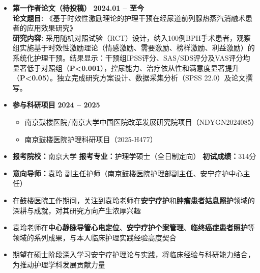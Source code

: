 \documentclass[zh]{resume}
\begin{document}
\begin{itemize}
        \small
        \item
        \textbf{第一作者论文（待投稿）} \hfill \textbf{2024.01 -- 至今}
          \\
        \textbf{论文题目: } 《基于时效性激励理论的护理干预在经尿道前列腺热蒸汽消融术患者的应用效果研究》
        \\
        \textbf{研究内容: } 采用随机对照试验（RCT）设计，纳入100例BPH手术患者，观察组实施基于时效性激励理论（情感激励、需要激励、榜样激励、利益激励）的系统化护理干预。结果显示：干预组IPSS评分、SAS/SDS评分及VAS评分均显著低于对照组（\textbf{P<0.001}），控尿能力、治疗依从性和满意度显著提升（\textbf{P<0.05}）。独立完成研究方案设计、数据采集分析（SPSS 22.0）及论文撰写。

        \item
        \textbf{参与科研项目} \hfill \textbf{2024 -- 2025}
        \begin{itemize}
            \item 南京鼓楼医院/南京大学中国医院改革发展研究院项目（NDYGN2024085）
            \item 南京鼓楼医院护理科研项目（2025-H477）
        \end{itemize}
\end{itemize}


\begin{itemize}
    \small
    \item \textbf{报考院校：}南京大学 \hfill \textbf{报考专业：}护理学硕士（全日制定向） \hfill \textbf{初试成绩：}314分
    \item \textbf{意向导师：}袁玲 副主任护师（南京鼓楼医院护理部副主任、安宁疗护中心主任）
    \item 在鼓楼医院工作期间，关注到袁玲老师在\textbf{安宁疗护}和\textbf{肿瘤患者姑息照护}领域的深耕与成就，对其研究方向产生浓厚兴趣
    \item 袁玲老师在\textbf{中心静脉导管心电定位}、\textbf{安宁疗护个案管理}、\textbf{临终癌症患者照护}等领域的系列成果，与本人临床护理实践经验高度契合
    \item 期望在硕士阶段深入学习安宁疗护理论与实践，将临床经验与科研能力结合，为推动护理学科发展贡献力量
\end{itemize}

\end{document}
